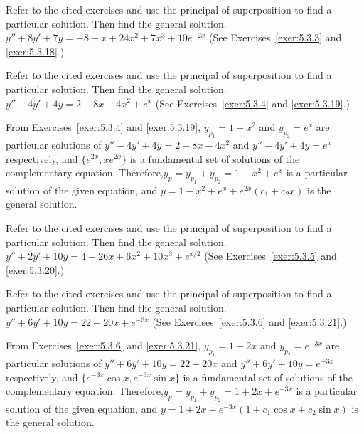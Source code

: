 \documentclass{ximera}
\begin{document}
\begin{problem}\label{exer:5.3.35} Refer
to the cited exercises and use the principal of superposition to find
a particular solution. Then find the general solution. $y''+8y'+7y=-8-x+24x^2+7x^3+10e^{-2x}$
(See Exercises~\ref{exer:5.3.3} and \ref{exer:5.3.18}.)
\end{problem}

\begin{problem}\label{exer:5.3.36} Refer
to the cited exercises and use the principal of superposition to find
a particular solution. Then find the general solution. $y''-4y'+4y=2+8x-4x^2+e^{x}$
(See Exercises~\ref{exer:5.3.4} and \ref{exer:5.3.19}.)
\begin{solution}
From Exercises~\ref{exer:5.3.4} and \ref{exer:5.3.19},
$y_{p_1}=1-x^2$ and $y_{p_2}=e^{x}$  are particular solutions of
$y''-4y'+4y=2+8x-4x^2$
and
$y''-4y'+4y=e^{x}$
respectively, and $\{e^{2x},xe^{2x}\}$
is a fundamental set of solutions of the complementary equation.
Therefore,$y_p=y_{p_1}+y_{p_2}=1-x^2+e^{x}$
is a particular solution of the given equation, and
$y=1-x^2+e^{x}+e^{2x}(c_1+c_2x)$
is the general solution.
\end{solution}
\end{problem}

\begin{problem}\label{exer:5.3.37} Refer
to the cited exercises and use the principal of superposition to find
a particular solution. Then find the general solution. $y''+2y'+10y=4+26x+6x^2+10x^3+e^{x/2}$
(See Exercises~\ref{exer:5.3.5} and \ref{exer:5.3.20}.)
\end{problem}

\begin{problem}\label{exer:5.3.38} Refer
to the cited exercises and use the principal of superposition to find
a particular solution. Then find the general solution. $y''+6y'+10y=22+20x+e^{-3x}$
(See Exercises~\ref{exer:5.3.6} and \ref{exer:5.3.21}.)
\begin{solution}
From Exercises~\ref{exer:5.3.6} and \ref{exer:5.3.21},
$y_{p_1}=1+2x$ and $y_{p_2}=e^{-3x}$  are particular solutions of
$y''+6y'+10y=22+20x$
and
$y''+6y'+10y=e^{-3x}$
respectively, and $\{e^{-3x}\cos x,e^{-3x}\sin x\}$
is a fundamental set of solutions of the complementary equation.
Therefore,$y_p=y_{p_1}+y_{p_2}=1+2x+e^{-3x}$
is a particular solution of the given equation, and
$y=1+2x+e^{-3x}(1+c_1\cos x+c_2\sin x)$
is the general solution.
\end{solution}
\end{problem}
\end{document}
